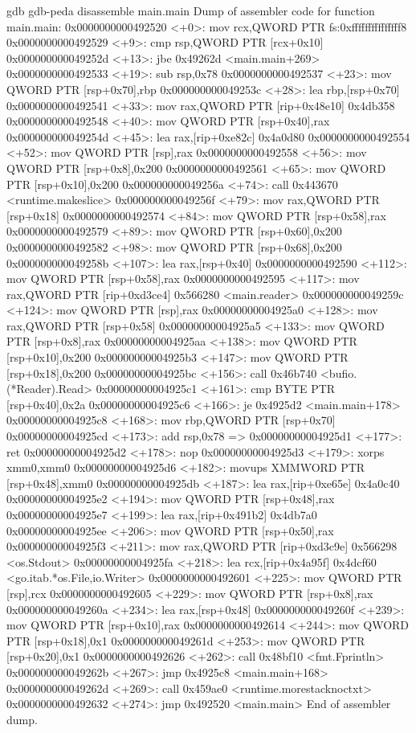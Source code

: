 gdb
gdb-peda disassemble main.main
Dump of assembler code for function main.main:
   0x0000000000492520 <+0>:	mov    rcx,QWORD PTR fs:0xfffffffffffffff8
   0x0000000000492529 <+9>:	cmp    rsp,QWORD PTR [rcx+0x10]
   0x000000000049252d <+13>:	jbe    0x49262d <main.main+269>
   0x0000000000492533 <+19>:	sub    rsp,0x78
   0x0000000000492537 <+23>:	mov    QWORD PTR [rsp+0x70],rbp
   0x000000000049253c <+28>:	lea    rbp,[rsp+0x70]
   0x0000000000492541 <+33>:	mov    rax,QWORD PTR [rip+0x48e10]         0x4db358
   0x0000000000492548 <+40>:	mov    QWORD PTR [rsp+0x40],rax
   0x000000000049254d <+45>:	lea    rax,[rip+0xe82c]         0x4a0d80
   0x0000000000492554 <+52>:	mov    QWORD PTR [rsp],rax
   0x0000000000492558 <+56>:	mov    QWORD PTR [rsp+0x8],0x200
   0x0000000000492561 <+65>:	mov    QWORD PTR [rsp+0x10],0x200
   0x000000000049256a <+74>:	call   0x443670 <runtime.makeslice>
   0x000000000049256f <+79>:	mov    rax,QWORD PTR [rsp+0x18]
   0x0000000000492574 <+84>:	mov    QWORD PTR [rsp+0x58],rax
   0x0000000000492579 <+89>:	mov    QWORD PTR [rsp+0x60],0x200
   0x0000000000492582 <+98>:	mov    QWORD PTR [rsp+0x68],0x200
   0x000000000049258b <+107>:	lea    rax,[rsp+0x40]
   0x0000000000492590 <+112>:	mov    QWORD PTR [rsp+0x58],rax
   0x0000000000492595 <+117>:	mov    rax,QWORD PTR [rip+0xd3ce4]         0x566280 <main.reader>
   0x000000000049259c <+124>:	mov    QWORD PTR [rsp],rax
   0x00000000004925a0 <+128>:	mov    rax,QWORD PTR [rsp+0x58]
   0x00000000004925a5 <+133>:	mov    QWORD PTR [rsp+0x8],rax
   0x00000000004925aa <+138>:	mov    QWORD PTR [rsp+0x10],0x200
   0x00000000004925b3 <+147>:	mov    QWORD PTR [rsp+0x18],0x200
   0x00000000004925bc <+156>:	call   0x46b740 <bufio.(*Reader).Read>
   0x00000000004925c1 <+161>:	cmp    BYTE PTR [rsp+0x40],0x2a
   0x00000000004925c6 <+166>:	je     0x4925d2 <main.main+178>
   0x00000000004925c8 <+168>:	mov    rbp,QWORD PTR [rsp+0x70]
   0x00000000004925cd <+173>:	add    rsp,0x78
=> 0x00000000004925d1 <+177>:	ret
   0x00000000004925d2 <+178>:	nop
   0x00000000004925d3 <+179>:	xorps  xmm0,xmm0
   0x00000000004925d6 <+182>:	movups XMMWORD PTR [rsp+0x48],xmm0
   0x00000000004925db <+187>:	lea    rax,[rip+0xe65e]         0x4a0c40
   0x00000000004925e2 <+194>:	mov    QWORD PTR [rsp+0x48],rax
   0x00000000004925e7 <+199>:	lea    rax,[rip+0x491b2]         0x4db7a0
   0x00000000004925ee <+206>:	mov    QWORD PTR [rsp+0x50],rax
   0x00000000004925f3 <+211>:	mov    rax,QWORD PTR [rip+0xd3c9e]         0x566298 <os.Stdout>
   0x00000000004925fa <+218>:	lea    rcx,[rip+0x4a95f]         0x4dcf60 <go.itab.*os.File,io.Writer>
   0x0000000000492601 <+225>:	mov    QWORD PTR [rsp],rcx
   0x0000000000492605 <+229>:	mov    QWORD PTR [rsp+0x8],rax
   0x000000000049260a <+234>:	lea    rax,[rsp+0x48]
   0x000000000049260f <+239>:	mov    QWORD PTR [rsp+0x10],rax
   0x0000000000492614 <+244>:	mov    QWORD PTR [rsp+0x18],0x1
   0x000000000049261d <+253>:	mov    QWORD PTR [rsp+0x20],0x1
   0x0000000000492626 <+262>:	call   0x48bf10 <fmt.Fprintln>
   0x000000000049262b <+267>:	jmp    0x4925c8 <main.main+168>
   0x000000000049262d <+269>:	call   0x459ae0 <runtime.morestacknoctxt>
   0x0000000000492632 <+274>:	jmp    0x492520 <main.main>
End of assembler dump.


